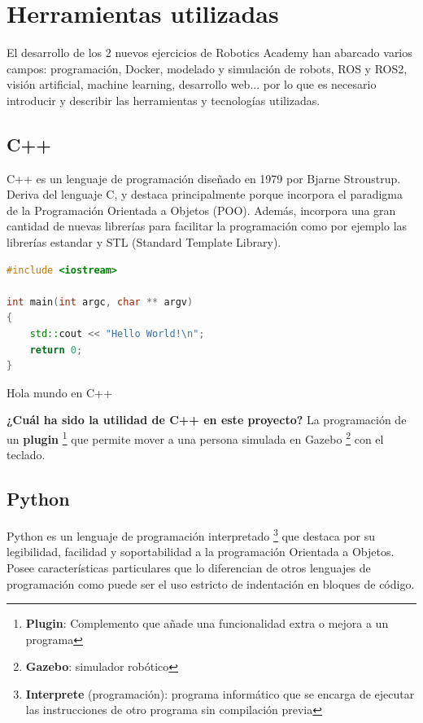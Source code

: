 \chapter{Herramientas utilizadas}
\label{cap:capitulo3}

El desarrollo de los 2 nuevos ejercicios de Robotics Academy han abarcado varios campos: programación, Docker, modelado y simulación de robots, ROS y ROS2, visión artificial, machine learning, desarrollo web... por lo que es necesario introducir y describir las herramientas y tecnologías utilizadas.




\section{C++}
\label{sec:c++}

C++ es un lenguaje de programación diseñado en 1979 por Bjarne Stroustrup. Deriva del lenguaje C, y destaca principalmente porque incorpora el paradigma de la Programación Orientada a Objetos (POO). Además, incorpora una gran cantidad de nuevas librerías para facilitar la programación como por ejemplo las librerías estandar y STL (Standard Template Library).\\

\begin{code}[H]
\begin{lstlisting}[language=C++]
#include <iostream>

int main(int argc, char ** argv)
{
	std::cout << "Hello World!\n";
	return 0;
}
\end{lstlisting}
\caption[Hola mundo en C++]{Hola mundo en C++}
\label{cod:holamundo_cplusplus}
\end{code}

\textbf{¿Cuál ha sido la utilidad de C++ en este proyecto?} La programación de un \textbf{plugin} \footnote{\textbf{Plugin}: Complemento que añade una funcionalidad extra o mejora a un programa} que permite mover a una persona simulada en Gazebo \footnote{\textbf{Gazebo}: simulador robótico} con el teclado.\\




\section{Python}
\label{sec:python}

Python es un lenguaje de programación interpretado \footnote{\textbf{Interprete} (programación): programa informático que se encarga de ejecutar las instrucciones de otro programa sin compilación previa} que destaca por su legibilidad, facilidad y soportabilidad a la programación Orientada a Objetos. Posee características particulares que lo diferencian de otros lenguajes de programación como puede ser el uso estricto de indentación en bloques de código.\\

